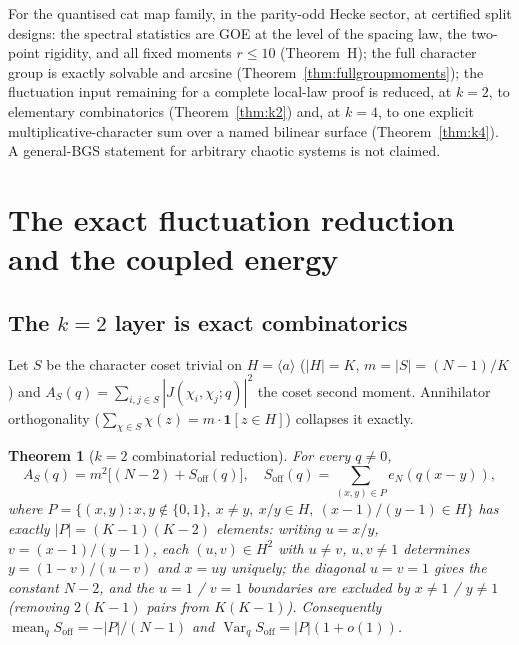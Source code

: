 \documentclass[11pt,reqno]{amsart}
\newtheorem{theorem}{Theorem}[section]
\theoremstyle{definition}
\begin{document}
For the quantised cat map family, in the parity-odd Hecke sector, at
certified split designs: the spectral statistics are GOE at the level of
the spacing law, the two-point rigidity, and all fixed moments
$r \le 10$ (Theorem~H); the full character group is exactly solvable and
arcsine (Theorem~\ref{thm:fullgroupmoments}); the fluctuation input
remaining for a complete local-law proof is reduced, at $k = 2$, to
elementary combinatorics (Theorem~\ref{thm:k2}) and, at $k = 4$, to one
explicit multiplicative-character sum over a named bilinear surface
(Theorem~\ref{thm:k4}).  A general-BGS statement for arbitrary chaotic
systems is not claimed.



\section{The exact fluctuation reduction and the coupled energy}
\label{sec:r92}

\subsection{The \texorpdfstring{$k=2$}{k=2} layer is exact combinatorics}

Let $S$ be the character coset trivial on $H = \langle a\rangle$
($|H| = K$, $m = |S| = (N{-}1)/K$) and
$A_S(q) = \sum_{i,j \in S} |J(\chi_i,\chi_j;q)|^2$ the coset second
moment.  Annihilator orthogonality
($\sum_{\chi \in S} \chi(z) = m \cdot \mathbf{1}[z \in H]$) collapses it
exactly.

\begin{theorem}[$k=2$ combinatorial reduction]
\label{thm:k2exact}
For every $q \neq 0$,
\[
  A_S(q) = m^2 \big[ (N-2) + S_{\mathrm{off}}(q) \big],
  \quad
  S_{\mathrm{off}}(q) = \sum_{(x,y) \in P} e_N(q(x-y)),
\]
where
$P = \{(x,y) : x,y \notin \{0,1\},\ x \ne y,\ x/y \in H,\
(x{-}1)/(y{-}1) \in H\}$
has exactly $|P| = (K{-}1)(K{-}2)$ elements: writing
$u = x/y$, $v = (x{-}1)/(y{-}1)$, each $(u,v) \in H^2$ with
$u \ne v$, $u,v \ne 1$ determines $y = (1{-}v)/(u{-}v)$ and $x = uy$
uniquely; the diagonal $u = v = 1$ gives the constant $N{-}2$, and the
$u = 1$ / $v = 1$ boundaries are excluded by $x \ne 1$ / $y \ne 1$
(removing $2(K{-}1)$ pairs from $K(K{-}1)$).  Consequently
$\operatorname{mean}_q S_{\mathrm{off}} = -|P|/(N{-}1)$ and
$\operatorname{Var}_q S_{\mathrm{off}} = |P|(1+o(1))$.
\end{theorem}
\end{document}
